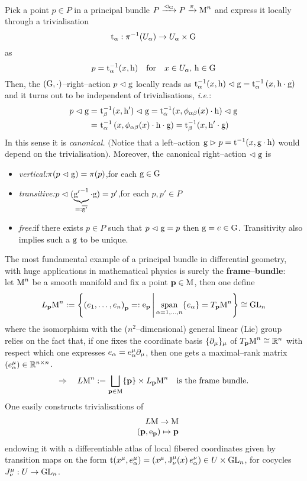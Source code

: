 \begin{remark}\label{canonical_right_action}
    Pick a point $p\in P$ in a principal bundle $P\xrightarrow{\vartriangleleft_{\text{\normalfont G}}}P\xrightarrow{\pi}\text{\normalfont M}^n$ and express it locally through a trivialisation $$\text{\normalfont t}_\alpha:\pi^{-1}(U_\alpha)\to U_\alpha\times\text{\normalfont G}$$ as
    $$p=\text{\normalfont t}^{-1}_\alpha(x,\text{\normalfont h})\quad\text{for}\quad x\in U_\alpha,\,\text{\normalfont h}\in\text{\normalfont G}$$
    Then, the $(\text{\normalfont G},\cdot)$--right--action $p\vartriangleleft\text{\normalfont g}$ locally reads as $\text{\normalfont t}^{-1}_\alpha(x,\text{\normalfont h})\vartriangleleft\text{\normalfont g}=\text{\normalfont t}^{-1}_\alpha\left(x,\text{\normalfont h}\cdot\text{\normalfont g}\right)$ and it turns out to be independent of trivialisations, \emph{i.e.}:
    \begin{align*}
        p\vartriangleleft\text{\normalfont g}=&\,\,\text{\normalfont t}^{-1}_\beta(x,\text{\normalfont h}')\vartriangleleft\text{\normalfont g}=\text{\normalfont t}^{-1}_\alpha(x,\phi_{\alpha\beta}(x)\cdot\text{\normalfont h})\vartriangleleft\text{\normalfont g}\\
        =&\,\,\text{\normalfont t}^{-1}_\alpha\left(x,\phi_{\alpha\beta}(x)\cdot\text{\normalfont h}\cdot\text{\normalfont g}\right)=\text{\normalfont t}^{-1}_\beta(x,\text{\normalfont h}'\cdot\text{\normalfont g})
    \end{align*}
    In this sense it is \emph{canonical.} $($Notice that a left--action $\text{\normalfont g}\vartriangleright p=\text{\normalfont t}^{-1}(x,\text{\normalfont g}\cdot\text{\normalfont h})$ would depend on the trivialisation$)$. Moreover, the canonical right--action $\vartriangleleft\text{\normalfont g}$ is
    \begin{itemize}
        \item \emph{vertical:}\quad $\pi(p\vartriangleleft\text{\normalfont g})=\pi(p)$,\quad for each $\text{\normalfont g}\in\text{\normalfont G}$
        \item \emph{transitive:}\quad $p\vartriangleleft(\underbrace{{\text{\normalfont g}'}^{-1}}_{=:\overline{\text{\normalfont g}'}}\cdot\text{\normalfont g})=p'$,\quad for each $p,p'\in P$
        \item \emph{free:}\quad if there exists $p\in P$ such that $p\vartriangleleft\text{\normalfont g}=p$ then $\text{\normalfont g}=e\in\text{\normalfont G}$. Transitivity also implies such a $\text{\normalfont g}$ to be unique.
    \end{itemize}
\end{remark}

The most fundamental example of a principal bundle in differential geometry, with huge applications in mathematical physics is surely the \textbf{frame--bundle}: \\
let $\text{\normalfont M}^n$ be a smooth manifold and fix a point $\mathbf{p}\in\text{\normalfont M}$, then one define
$$L_{\mathbf{p}}\text{\normalfont M}^n:=\left\{{(e_1,\hdots,e_n)}_{\mathbf{p}}=:\text{\normalfont e}_{\mathbf{p}}\,\Biggl|\,\mathop{\operatorname{span}}_{\alpha=1,\hdots,n}\{e_\alpha\}=T_{\mathbf{p}}\text{\normalfont M}^n\right\}\cong\text{\normalfont GL}_n$$
where the isomorphism with the ($n^2$--dimensional) general linear (Lie) group relies on the fact that, if one fixes the coordinate basis $\{\partial_\mu\}_{\mu}$ of $T_{\mathbf{p}}\text{\normalfont M}^n\cong\mathbb{R}^n$ with respect which one expresses $e_\alpha=e_\alpha^\mu\partial_\mu$, then one gets a maximal--rank matrix $(e^\mu_\alpha)\in\mathbb{R}^{n\times n}$.
$$\Rightarrow\quad L\text{\normalfont M}^n:=\bigsqcup_{\mathbf{p}\in\text{\normalfont M}}\{\mathbf{p}\}\times L_{\mathbf{p}}\text{\normalfont M}^n\quad\text{is the frame bundle}.$$
One easily constructs trivialisations of 
$$\begin{matrix}
    \qquad L\text{\normalfont M}\to\text{\normalfont M}\\
    \quad(\mathbf{p},\text{\normalfont e}_{\mathbf{p}})\mapsto\mathbf{p}
\end{matrix}$$
endowing it with a differentiable atlas of local fibered coordinates given by transition maps on the form $\text{\normalfont t}(x^\mu,e^\mu_\alpha)=(x^\mu,\text{\normalfont J}^\mu_\nu(x)\,e^\nu_\alpha)\in U\times\text{\normalfont GL}_n$, for cocycles $J^\mu_\nu:U\to\text{\normalfont GL}_n$.

